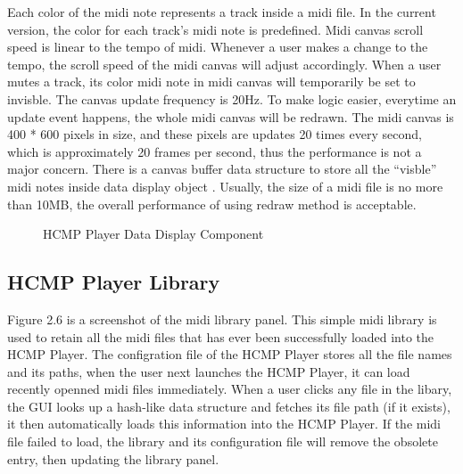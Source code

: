 Each color of the midi note represents a track inside 
a midi file. In the current version, the color for each track's midi note is predefined. 
Midi canvas scroll speed is linear to the tempo of midi. Whenever a user 
makes a change to the tempo, the scroll speed of the midi canvas will adjust
accordingly. When a user mutes a
track, its color midi note in midi canvas will temporarily be set to invisble. 
The canvas
update frequency is 20Hz. To make logic easier, everytime an update event 
happens, the whole midi canvas will be redrawn. The midi canvas is 400 * 600 pixels 
in size, and these pixels are updates 20 times every second, which is approximately 
20 frames per second, thus the performance is not
a major concern. There is a canvas buffer data 
structure to store all the ``visble'' midi notes inside data display object . 
Usually, the size of a midi file is no more than 10MB, the overall performance of 
using redraw method is acceptable.

\begin{figure}[H]
\caption{HCMP Player Data Display Component}
\label{fig:speciation}
\end{figure}

\subsection{HCMP Player Library}

Figure 2.6 is a screenshot of the midi library panel. This simple midi library is 
used to retain all the midi files that has ever been successfully loaded into the HCMP Player. 
The configration file of the HCMP Player stores all the file names and its paths, 
when the user next launches the HCMP Player, it can load
recently openned midi files immediately. When a user clicks any file in the libary, 
the GUI looks up a hash-like data structure and fetches its file path (if it exists),
it then automatically
loads this information into the HCMP Player. If the midi file failed to load, the library and its
configuration file will remove the obsolete entry, then updating the library panel.

